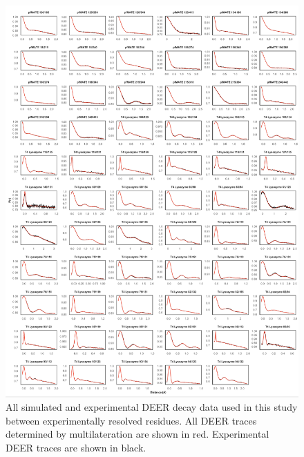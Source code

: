 \begin{figure}[h]
\centering
\includegraphics[width=6in]{Figures/multilateration_supp_alltraces.pdf}
\caption[All simulated and experimental DEER decay data used in this study between experimentally resolved residues.]{All simulated and experimental DEER decay data used in this study between experimentally resolved residues. All DEER traces determined by multilateration are shown in red. Experimental DEER traces are shown in black.}
\label{fig:multilateration_supp_alltraces}
\end{figure}

